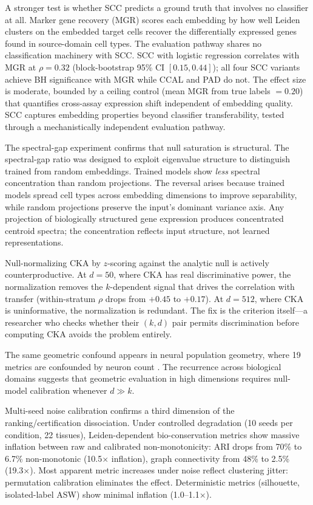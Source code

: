 \documentclass[11pt]{article}
\begin{document}
A stronger test is whether SCC predicts a ground truth that involves
no classifier at all. Marker gene recovery (MGR) scores each embedding
by how well Leiden clusters on the embedded target cells recover the
differentially expressed genes found in source-domain cell types. The
evaluation pathway shares no classification machinery with SCC. SCC
with logistic regression correlates with MGR at $\rho = 0.32$
(block-bootstrap 95\% CI $[0.15, 0.44]$); all four SCC variants
achieve BH significance with MGR while CCAL and PAD do not. The
effect size is moderate, bounded by a ceiling control (mean MGR from
true labels $= 0.20$) that quantifies cross-assay expression shift
independent of embedding quality. SCC captures embedding properties
beyond classifier transferability, tested through a mechanistically
independent evaluation pathway.

The spectral-gap experiment confirms that null saturation is structural.
The spectral-gap ratio was designed to exploit eigenvalue structure to
distinguish trained from random embeddings. Trained models show
\emph{less} spectral concentration than random projections. The
reversal arises because
trained models spread cell types across embedding dimensions to improve
separability, while random projections preserve the input's dominant
variance axis. Any projection of biologically structured gene expression
produces concentrated centroid spectra; the concentration reflects input
structure, not learned representations.

Null-normalizing CKA by $z$-scoring against the analytic null is
actively counterproductive. At $d = 50$, where CKA has real
discriminative power, the normalization removes the $k$-dependent signal
that drives the correlation with transfer (within-stratum $\rho$ drops
from $+0.45$ to $+0.17$). At $d = 512$, where CKA is uninformative,
the normalization is redundant. The fix is the criterion itself---a
researcher who checks whether their $(k, d)$ pair permits discrimination
before computing CKA avoids the problem entirely.

The same geometric confound appears in neural population geometry, where
19 metrics are confounded by neuron count \citep{tower2026bracket}. The
recurrence across biological domains suggests that geometric evaluation
in high dimensions requires null-model calibration whenever $d \gg k$.

Multi-seed noise calibration confirms a third dimension of the
ranking/certification dissociation. Under controlled degradation (10
seeds per condition, 22 tissues), Leiden-dependent bio-conservation
metrics show massive inflation between raw and calibrated
non-monotonicity: ARI drops from 70\% to 6.7\% non-monotonic
(10.5$\times$ inflation), graph connectivity from 48\% to 2.5\%
(19.3$\times$). Most apparent metric increases under noise reflect
clustering jitter: permutation calibration eliminates the effect.
Deterministic metrics (silhouette, isolated-label ASW) show minimal
inflation (1.0--1.1$\times$).
\end{document}
